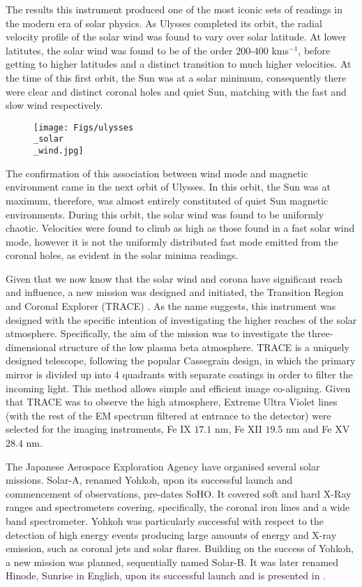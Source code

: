 The results this instrument produced one of the most iconic sets of readings in the modern era of solar physics.
As Ulysses completed its orbit, the radial velocity profile of the solar wind was found to vary over solar latitude.
At lower latitutes, the solar wind was found to be of the order $200$-$400$ kms$^{-1}$, before getting to higher latitudes and a distinct transition to much higher velocities.
At the time of this first orbit, the Sun was at a solar minimum, consequently there were clear and distinct coronal holes and quiet Sun, matching with the fast and slow wind respectively.

\begin{figure}
	\texttt{[image: Figs/ulysses\\\_solar\\\_wind.jpg]}
	\caption{\cite{McComas2003}}
	\label{fig:ulysses_sw}
\end{figure}

The confirmation of this association between wind mode and magnetic environment came in the next orbit of Ulysses.
In this orbit, the Sun was at maximum, therefore, was almost entirely constituted of quiet Sun magnetic environments.
During this orbit, the solar wind was found to be uniformly chaotic.
Velocities were found to climb as high as those found in a fast solar wind mode, however it is not the uniformly distributed fast mode emitted from the coronal holes, as evident in the solar minima readings.

Given that we now know that the solar wind and corona have significant reach and influence, a new mission was designed and initiated, the Transition Region and Coronal Explorer (TRACE) \cite{Gaeng1998}.
As the name suggests, this instrument was designed with the specific intention of investigating the higher reaches of the solar atmosphere.
Specifically, the aim of the mission was to investigate the three-dimensional structure of the low plasma beta atmosphere.
TRACE is a uniquely designed telescope, following the popular Cassegrain design, in which the primary mirror is divided up into 4 quadrants with separate coatings in order to filter the incoming light.
This method allows simple and efficient image co-aligning.
Given that TRACE was to observe the high atmosphere, Extreme Ultra Violet lines (with the rest of the EM spectrum filtered at entrance to the detector) were selected for the imaging instruments, Fe IX $17.1$ nm, Fe XII $19.5$ nm and Fe XV $28.4$ nm.




The Japanese Aerospace Exploration Agency have organised several solar missions.
Solar-A, renamed Yohkoh, \cite{Tsuneta1992} upon its successful launch and commencement of observations, pre-dates SoHO.
It covered soft and hard X-Ray ranges and spectrometers covering, specifically, the coronal iron lines and a wide band spectrometer. 
Yohkoh was particularly successful with respect to the detection of high energy events producing large amounts of energy and X-ray emission, such as coronal jets and solar flares.
Building on the success of Yohkoh, a new mission was planned, sequentially named Solar-B.
It was later renamed Hinode, Sunrise in English, upon its successful launch and is presented in \cite{Kosugi2007}.
 
